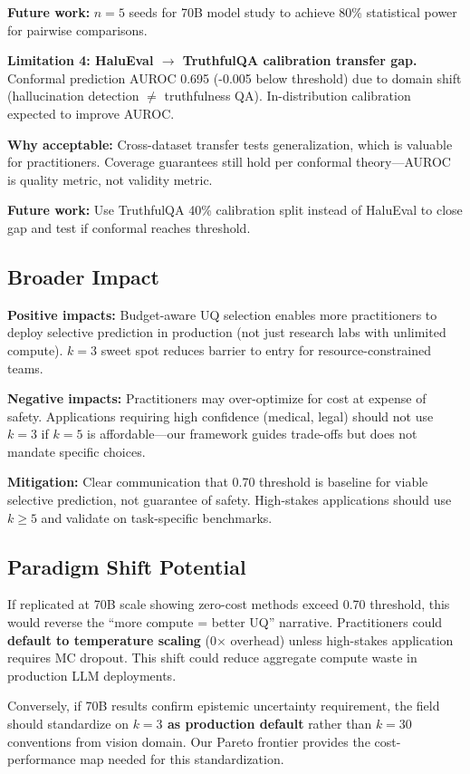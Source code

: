 \textbf{Future work:} $n=5$ seeds for 70B model study to achieve 80\% statistical power for pairwise comparisons.

\textbf{Limitation 4: HaluEval $\rightarrow$ TruthfulQA calibration transfer gap.} Conformal prediction AUROC 0.695 (-0.005 below threshold) due to domain shift (hallucination detection $\neq$ truthfulness QA). In-distribution calibration expected to improve AUROC.

\textbf{Why acceptable:} Cross-dataset transfer tests generalization, which is valuable for practitioners. Coverage guarantees still hold per conformal theory---AUROC is quality metric, not validity metric.

\textbf{Future work:} Use TruthfulQA 40\% calibration split instead of HaluEval to close gap and test if conformal reaches threshold.

\subsection{Broader Impact}

\textbf{Positive impacts:} Budget-aware UQ selection enables more practitioners to deploy selective prediction in production (not just research labs with unlimited compute). $k=3$ sweet spot reduces barrier to entry for resource-constrained teams.

\textbf{Negative impacts:} Practitioners may over-optimize for cost at expense of safety. Applications requiring high confidence (medical, legal) should not use $k=3$ if $k=5$ is affordable---our framework guides trade-offs but does not mandate specific choices.

\textbf{Mitigation:} Clear communication that 0.70 threshold is baseline for viable selective prediction, not guarantee of safety. High-stakes applications should use $k\geq5$ and validate on task-specific benchmarks.

\subsection{Paradigm Shift Potential}

If replicated at 70B scale showing zero-cost methods exceed 0.70 threshold, this would reverse the ``more compute = better UQ'' narrative. Practitioners could \textbf{default to temperature scaling} (0$\times$ overhead) unless high-stakes application requires MC dropout. This shift could reduce aggregate compute waste in production LLM deployments.

Conversely, if 70B results confirm epistemic uncertainty requirement, the field should standardize on \textbf{$k=3$ as production default} rather than $k=30$ conventions from vision domain. Our Pareto frontier provides the cost-performance map needed for this standardization.
